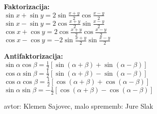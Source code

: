 \documentclass[10pt,a4paper]{amsart}
\theoremstyle{definition} %
\theoremstyle{plain} %
\newcommand{\dx}{\ensuremath{\,\mathrm{d}x}}
\newcommand{\dt}{\ensuremath{\,\mathrm{d}t}}
\let\oldint\int
\renewcommand{\int}{\oldint \!}
\begin{document}
\parbox{0.4\textwidth}{
\textbf{Faktorizacija:} \\
$\sin{x} + \sin{y} = 2\sin\frac{x+y}{2}\cos\frac{x-y}{2}$\\
$\sin{x} - \sin{y} = 2\cos\frac{x+y}{2}\sin\frac{x-y}{2}$\\
$\cos{x} + \cos{y} = 2\cos\frac{x+y}{2}\cos\frac{x-y}{2}$\\
$\cos{x} - \cos{y} =-2\sin\frac{x+y}{2}\sin\frac{x-y}{2}$
}
\parbox{0.4\textwidth}{
\textbf{Antifaktorizacija:} \\
$\sin\alpha\cos\beta = \frac{1}{2}\left[\sin(\alpha+\beta)+\sin(\alpha-\beta) \right]  $ \\
$\cos\alpha\sin\beta = \frac{1}{2}\left[\sin(\alpha+\beta)-\sin(\alpha-\beta) \right]  $ \\
$\cos\alpha\cos\beta = \frac{1}{2}\left[\cos(\alpha+\beta)+\cos(\alpha-\beta) \right]  $ \\
$\sin\alpha\sin\beta = -\frac{1}{2}\left[\cos(\alpha+\beta)-\cos(\alpha-\beta)  \right]$ \\
}
%
%
%
%
%
%
%

\vfill
\hfill avtor: Klemen Sajovec, malo sprememb: Jure Slak
\end{document}
